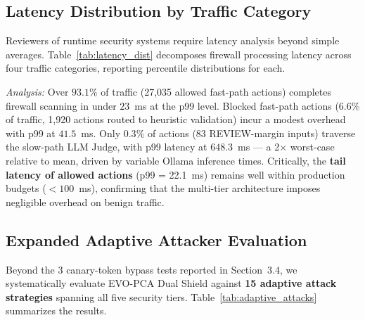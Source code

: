\documentclass[runningheads]{llncs}
\begin{document}
\subsection{Latency Distribution by Traffic Category}
Reviewers of runtime security systems require latency analysis beyond simple averages. Table~\ref{tab:latency_dist} decomposes firewall processing latency across four traffic categories, reporting percentile distributions for each.

\begin{table}[t]
\caption{Latency Distribution across Traffic Categories (29,038 Actions)}
\label{tab:latency_dist}
\centering
{}
\end{table}

\textit{Analysis:} Over $93.1\%$ of traffic (27,035 allowed fast-path actions) completes firewall scanning in under $23$~ms at the p99 level. Blocked fast-path actions ($6.6\%$ of traffic, 1,920 actions routed to heuristic validation) incur a modest overhead with p99 at $41.5$~ms. Only $0.3\%$ of actions (83 REVIEW-margin inputs) traverse the slow-path LLM Judge, with p99 latency at $648.3$~ms --- a 2$\times$ worst-case relative to mean, driven by variable Ollama inference times. Critically, the \textbf{tail latency of allowed actions} (p99 = 22.1~ms) remains well within production budgets ($<100$~ms), confirming that the multi-tier architecture imposes negligible overhead on benign traffic.

\subsection{Expanded Adaptive Attacker Evaluation}
Beyond the 3 canary-token bypass tests reported in Section~3.4, we systematically evaluate EVO-PCA Dual Shield against \textbf{15 adaptive attack strategies} spanning all five security tiers. Table~\ref{tab:adaptive_attacks} summarizes the results.
\end{document}
